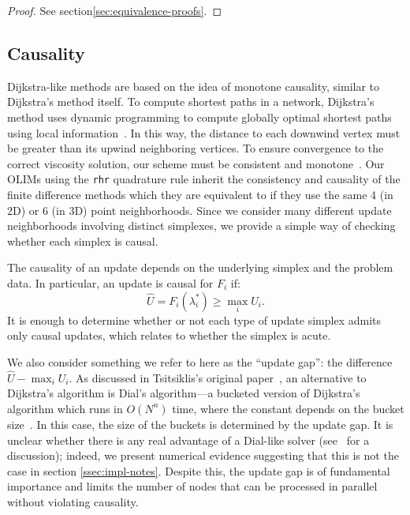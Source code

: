 \documentclass[smallcondensed]{svjour3}
\begin{document}
\begin{proof}
  See section\@ \ref{sec:equivalence-proofs}.
\end{proof}

\subsection{Causality}\label{ssec:causality} Dijkstra-like
methods are based on the idea of monotone causality, similar to
Dijkstra's method itself. To compute shortest paths in a network,
Dijkstra's method uses dynamic programming to compute globally optimal
shortest paths using local information~\cite{dijkstra1959note}. In
this way, the distance to each downwind vertex must be greater than
its upwind neighboring vertices. To ensure convergence to the correct
viscosity solution, our scheme must be consistent and
monotone~\cite{crandall1983viscosity}. Our OLIMs using the
\texttt{rhr} quadrature rule inherit the consistency and causality of
the finite difference methods which they are equivalent to if they use
the same 4 (in 2D) or 6 (in 3D) point neighborhoods. Since we consider
many different update neighborhoods involving distinct simplexes, we
provide a simple way of checking whether each simplex is causal.

The causality of an update depends on the underlying simplex and the
problem data. In particular, an update is causal for $F_i$ if:
\begin{equation}
  \hat{U} = F_i(\lambda_i^*) \geq \max_i U_i.
\end{equation}
It is enough to determine whether or not each type of update simplex
admits only causal updates, which relates to whether the simplex is
acute.

We also consider something we refer to here as the ``update gap'': the
difference $\hat{U} - \max_i U_i$. As discussed in Tsitsiklis's
original paper~\cite{tsitsiklis1995efficient}, an alternative to
Dijkstra's algorithm is Dial's algorithm---a bucketed version of
Dijkstra's algorithm which runs in $O(N^n)$ time, where the constant
depends on the bucket size~\cite{dial1969algorithm,kim2001calo}. In
this case, the size of the buckets is determined by the update gap. It
is unclear whether there is any real advantage of a Dial-like solver
(see~\cite{jeong2008fast} for a discussion); indeed, we present
numerical evidence suggesting that this is not the case in section\@
\ref{ssec:impl-notes}. Despite this, the update gap is of fundamental
importance and limits the number of nodes that can be processed in
parallel without violating causality.
\end{document}
